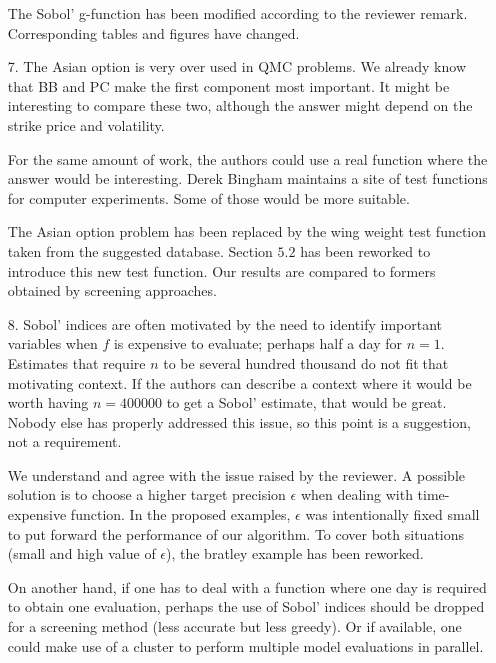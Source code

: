 \documentclass[10pt,a4paper]{article}
\begin{document}
\begin{itemize}
{\color{blue} The Sobol' g-function has been modified according to the reviewer remark. Corresponding tables and figures have changed.} 

\item[7.] The Asian option is very over used in QMC problems. We already know that BB and PC make the first component most important. It might be interesting to compare these two, although the answer might depend on
the strike price and volatility. 

For the same amount of work, the authors could use a real function where the answer would be interesting. Derek Bingham maintains a site of test functions for computer experiments. Some of those would be more suitable.

{\color{blue} The Asian option problem has been replaced by the wing weight test function taken from the suggested database. Section $5.2$ has been reworked to introduce this new test function. Our results are compared to formers obtained by screening approaches.} 

\item[8.] Sobol' indices are often motivated by the need to identify important variables when $f$ is expensive to evaluate; perhaps half a day for $n = 1$. Estimates that require $n$ to be several hundred thousand do not fitthat motivating context. If the authors can describe a context where it would be worth having $n = 400000$ to get a Sobol' estimate, that would be great. Nobody else has properly addressed this issue, so this point is a
suggestion, not a requirement.

{\color{blue} We understand and agree with the issue raised by the reviewer. A possible solution is to choose a higher target precision $\epsilon$ when dealing with time-expensive function. In the proposed examples, $\epsilon$ was intentionally fixed small to put forward the performance of our algorithm. To cover both situations (small and high value of $\epsilon$), the bratley example has been reworked.

On another hand, if one has to deal with a function where one day is required to obtain one evaluation, perhaps the use of Sobol' indices should be dropped for a screening method (less accurate but less greedy). Or if available, one could make use of a cluster to perform multiple model evaluations in parallel.}
\end{itemize}
\end{document}
